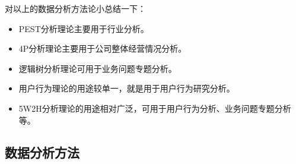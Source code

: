 对以上的数据分析方法论小总结一下：
\begin{itemize}
	\item PEST分析理论主要用于行业分析。
    \item 4P分析理论主要用于公司整体经营情况分析。
    \item 逻辑树分析理论可用于业务问题专题分析。
    \item 用户行为理论的用途较单一，就是用于用户行为研究分析。
    \item 5W2H分析理论的用途相对广泛，可用于用户行为分析、业务问题专题分析等。
\end{itemize}

\subsection{数据分析方法}

